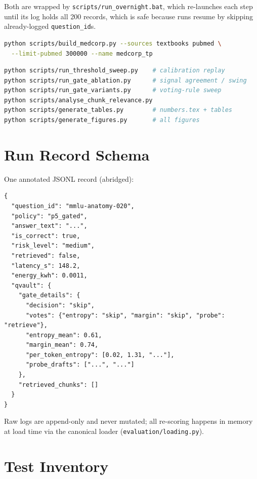 Both are wrapped by \texttt{scripts/run\_overnight.bat}, which re-launches
each step until its log holds all 200 records, which is safe because runs resume by
skipping already-logged \texttt{question\_id}s.

\begin{lstlisting}[language=bash,caption={Corpus build (resumable, shard-checkpointed).}]
python scripts/build_medcorp.py --sources textbooks pubmed \
  --limit-pubmed 300000 --name medcorp_tp
\end{lstlisting}

\begin{lstlisting}[language=bash,caption={Offline analyses (no model calls).}]
python scripts/run_threshold_sweep.py    # calibration replay
python scripts/run_gate_ablation.py      # signal agreement / swing
python scripts/run_gate_variants.py      # voting-rule sweep
python scripts/analyse_chunk_relevance.py
python scripts/generate_tables.py        # numbers.tex + tables
python scripts/generate_figures.py       # all figures
\end{lstlisting}

\section{Run Record Schema}
\label{app:schema}

One annotated JSONL record (abridged):

\begin{lstlisting}[caption={RunRecord example.},basicstyle=\ttfamily\scriptsize]
{
  "question_id": "mmlu-anatomy-020",
  "policy": "p5_gated",
  "answer_text": "...",
  "is_correct": true,
  "risk_level": "medium",
  "retrieved": false,
  "latency_s": 148.2,
  "energy_kwh": 0.0011,
  "qvault": {
    "gate_details": {
      "decision": "skip",
      "votes": {"entropy": "skip", "margin": "skip", "probe": "retrieve"},
      "entropy_mean": 0.61,
      "margin_mean": 0.74,
      "per_token_entropy": [0.02, 1.31, "..."],
      "probe_drafts": ["...", "..."]
    },
    "retrieved_chunks": []
  }
}
\end{lstlisting}

Raw logs are append-only and never mutated; all re-scoring happens in memory
at load time via the canonical loader (\texttt{evaluation/loading.py}).

\section{Test Inventory}
\label{app:tests}

